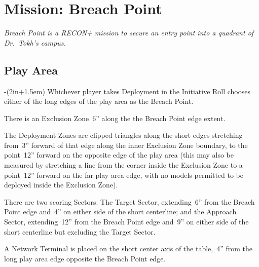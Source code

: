 \chapter{Mission: Breach Point}

\emph{\emph{Breach Point} is a RECON+ mission to secure an entry point
  into a quadrant of Dr.~Tokh's campus.}

\section{Play Area}
\vspace{-2\parskip}
\noindent\begin{stdminipage}{\linewidth-(2in+1.5em)}
\vspace{0pt}   
\noindent
Whichever player takes Deployment in the Initiative Roll chooses
either of the long edges of the play area as the Breach Point.

There is an Exclusion Zone~6'' along the the Breach Point edge extent.

The Deployment Zones are clipped triangles along the short edges
stretching from~3'' forward of that edge along the inner Exclusion
Zone boundary, to the point~12'' forward on the opposite edge of the
play area (this may also be measured by stretching a line from the
corner inside the Exclusion Zone to a point~12'' forward on the far
play area edge, with no models permitted to be deployed inside the
Exclusion Zone).

There are two scoring Sectors: The Target Sector, extending~6'' from
the Breach Point edge and~4'' on either side of the short centerline;
and the Approach Sector, extending~12'' from the Breach Point edge
and~9'' on either side of the short centerline but excluding the
Target Sector.

A Network Terminal is placed on the short center axis of the
table,~4'' from the long play area edge opposite the Breach Point
edge.
\end{stdminipage}
\hfill
